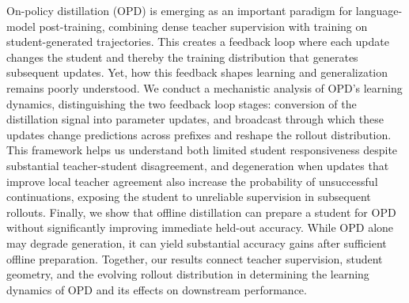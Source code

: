 On-policy distillation (OPD) is emerging as an important paradigm for language-model post-training, combining dense teacher supervision with training on student-generated trajectories. This creates a feedback loop where each update changes the student and thereby the training distribution that generates subsequent updates. Yet, how this feedback shapes learning and generalization remains poorly understood.
We conduct a mechanistic analysis of OPD's learning dynamics, distinguishing the two feedback loop stages: conversion of the distillation signal into parameter updates, and broadcast through which these updates change predictions across prefixes and reshape the rollout distribution.
This framework helps us understand both limited student responsiveness despite substantial teacher-student disagreement, and degeneration when updates that improve local teacher agreement also increase the probability of unsuccessful continuations, exposing the student to unreliable supervision in subsequent rollouts.
Finally, we show that offline distillation can prepare a student for OPD without significantly improving immediate held-out accuracy. While OPD alone may degrade generation, it can yield substantial accuracy gains after sufficient offline preparation. Together, our results connect teacher supervision, student geometry, and the evolving rollout distribution in determining the learning dynamics of OPD and its effects on downstream performance.